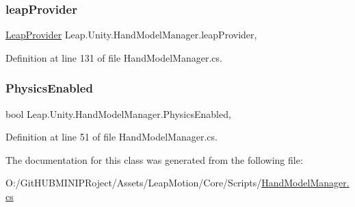 \subsubsection{\texorpdfstring{leapProvider}{leapProvider}}
{\footnotesize\ttfamily \mbox{\hyperlink{class_leap_1_1_unity_1_1_leap_provider}{Leap\+Provider}} Leap.\+Unity.\+Hand\+Model\+Manager.\+leap\+Provider\hspace{0.3cm}{\ttfamily [get]}, {\ttfamily [set]}}



Definition at line 131 of file Hand\+Model\+Manager.\+cs.

\mbox{\label{class_leap_1_1_unity_1_1_hand_model_manager_af8053a0572a5b769a4e2b3ad78eacd5f}} 
\subsubsection{\texorpdfstring{PhysicsEnabled}{PhysicsEnabled}}
{\footnotesize\ttfamily bool Leap.\+Unity.\+Hand\+Model\+Manager.\+Physics\+Enabled\hspace{0.3cm}{\ttfamily [get]}, {\ttfamily [set]}}



Definition at line 51 of file Hand\+Model\+Manager.\+cs.



The documentation for this class was generated from the following file\+:\begin{DoxyCompactItemize}
\item 
O\+:/\+Git\+H\+U\+B\+M\+I\+N\+I\+P\+Roject/\+Assets/\+Leap\+Motion/\+Core/\+Scripts/\mbox{\hyperlink{_hand_model_manager_8cs}{Hand\+Model\+Manager.\+cs}}\end{DoxyCompactItemize}
